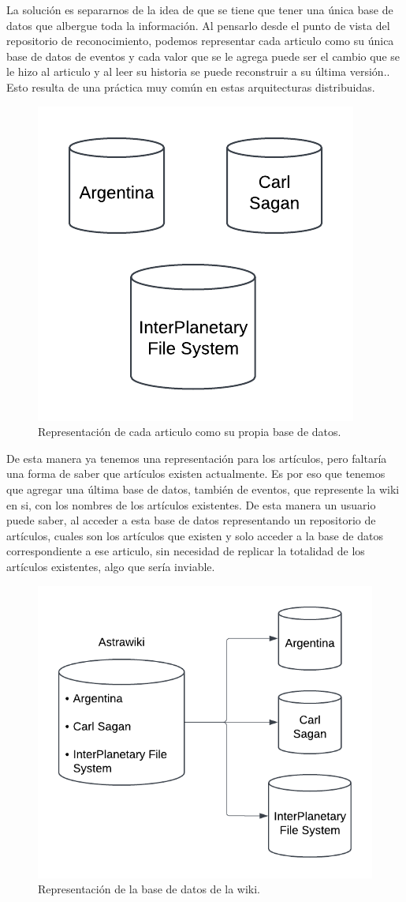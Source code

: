 La solución es separarnos de la idea de que se tiene que tener una única base de datos que albergue toda la información. Al pensarlo desde el punto de vista del repositorio de reconocimiento, podemos representar cada articulo como su única base de datos de eventos y cada valor que se le agrega puede ser el cambio que se le hizo al articulo y al leer su historia se puede reconstruir a su última versión.. Esto resulta de una práctica muy común en estas arquitecturas distribuidas.

\begin{figure}[h!]
    \centering
    \includegraphics[width=0.5\linewidth]{img/solucion-ipfs/bdd-articulos.png}
    \caption{Representación de cada articulo como su propia base de datos.}
    \label{fig:bdd-articulos}
\end{figure}

De esta manera ya tenemos una representación para los artículos, pero faltaría una forma de saber que artículos existen actualmente. Es por eso que tenemos que agregar una última base de datos, también de eventos, que represente la wiki en si, con los nombres de los artículos existentes. De esta manera un usuario puede saber, al acceder a esta base de datos representando un repositorio de artículos, cuales son los artículos que existen y solo acceder a la base de datos correspondiente a ese articulo, sin necesidad de replicar la totalidad de los artículos existentes, algo que sería inviable.

\begin{figure}[h!]
    \centering
    \includegraphics[width=0.5\linewidth]{img/solucion-ipfs/bdd-wiki.png}
    \caption{Representación de la base de datos de la wiki.}
    \label{fig:bdd-wiki}
\end{figure}

